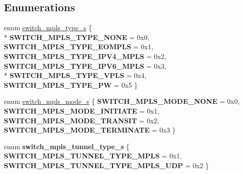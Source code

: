 \subsection*{Enumerations}
\begin{DoxyCompactItemize}
\item 
enum \hyperlink{group__Tunnel_ga0604465b082bd3c18d8252cc9d50e771}{switch\+\_\+mpls\+\_\+type\+\_\+s} \{ \\*
{\bfseries S\+W\+I\+T\+C\+H\+\_\+\+M\+P\+L\+S\+\_\+\+T\+Y\+P\+E\+\_\+\+N\+O\+N\+E} = 0x0, 
{\bfseries S\+W\+I\+T\+C\+H\+\_\+\+M\+P\+L\+S\+\_\+\+T\+Y\+P\+E\+\_\+\+E\+O\+M\+P\+L\+S} = 0x1, 
{\bfseries S\+W\+I\+T\+C\+H\+\_\+\+M\+P\+L\+S\+\_\+\+T\+Y\+P\+E\+\_\+\+I\+P\+V4\+\_\+\+M\+P\+L\+S} = 0x2, 
{\bfseries S\+W\+I\+T\+C\+H\+\_\+\+M\+P\+L\+S\+\_\+\+T\+Y\+P\+E\+\_\+\+I\+P\+V6\+\_\+\+M\+P\+L\+S} = 0x3, 
\\*
{\bfseries S\+W\+I\+T\+C\+H\+\_\+\+M\+P\+L\+S\+\_\+\+T\+Y\+P\+E\+\_\+\+V\+P\+L\+S} = 0x4, 
{\bfseries S\+W\+I\+T\+C\+H\+\_\+\+M\+P\+L\+S\+\_\+\+T\+Y\+P\+E\+\_\+\+P\+W} = 0x5
 \}
\item 
enum \hyperlink{group__Tunnel_ga9422139cfd73bb4e5796a35c4569d763}{switch\+\_\+mpls\+\_\+mode\+\_\+s} \{ {\bfseries S\+W\+I\+T\+C\+H\+\_\+\+M\+P\+L\+S\+\_\+\+M\+O\+D\+E\+\_\+\+N\+O\+N\+E} = 0x0, 
{\bfseries S\+W\+I\+T\+C\+H\+\_\+\+M\+P\+L\+S\+\_\+\+M\+O\+D\+E\+\_\+\+I\+N\+I\+T\+I\+A\+T\+E} = 0x1, 
{\bfseries S\+W\+I\+T\+C\+H\+\_\+\+M\+P\+L\+S\+\_\+\+M\+O\+D\+E\+\_\+\+T\+R\+A\+N\+S\+I\+T} = 0x2, 
{\bfseries S\+W\+I\+T\+C\+H\+\_\+\+M\+P\+L\+S\+\_\+\+M\+O\+D\+E\+\_\+\+T\+E\+R\+M\+I\+N\+A\+T\+E} = 0x3
 \}
\item 
\hypertarget{group__Tunnel_gad462fe4bcfc60a5accb57fca50604119}{enum {\bfseries switch\+\_\+mpls\+\_\+tunnel\+\_\+type\+\_\+s} \{ {\bfseries S\+W\+I\+T\+C\+H\+\_\+\+M\+P\+L\+S\+\_\+\+T\+U\+N\+N\+E\+L\+\_\+\+T\+Y\+P\+E\+\_\+\+M\+P\+L\+S} = 0x1, 
{\bfseries S\+W\+I\+T\+C\+H\+\_\+\+M\+P\+L\+S\+\_\+\+T\+U\+N\+N\+E\+L\+\_\+\+T\+Y\+P\+E\+\_\+\+M\+P\+L\+S\+\_\+\+U\+D\+P} = 0x2
 \}}\label{group__Tunnel_gad462fe4bcfc60a5accb57fca50604119}


\end{DoxyCompactItemize}
